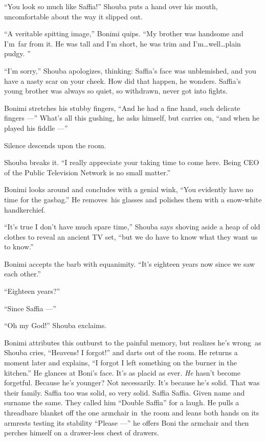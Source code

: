 \documentclass[twoside,11pt]{book}
\begin{document}
``You look so much like Saffia!'' Shouba puts a hand over his mouth, uncomfortable about the
way it slipped out.

``A veritable spitting image,'' Bonimi quips. ``My brother was handsome and
I'm~far from it. He was tall and I'm short, he was trim and I'm{\ldots}well{\ldots}plain pudgy. ''

``I'm sorry,'' Shouba apologizes, thinking: Saffia's face was unblemished,
and{ }you have a nasty scar on your cheek.  How did that happen,
he wonders. Saffia's young brother was always so quiet, so withdrawn, never got into fights.

Bonimi stretches his stubby fingers, ``And he had a fine hand, such delicate fingers ---''
What's all this gushing, he asks himself, but carries on, ``and when he played his fiddle ---''

Silence descends upon the room.

Shouba breaks it. ``I really appreciate your taking time to come here. Being CEO of the Public Television
Network is no small matter.''

Bonimi looks around and concludes with a genial wink, ``You evidently have no time for the
gasbag.'' He removes~his glasses and polishes them with a snow-white handkerchief.

``It's true I don't have much spare time,'' Shouba says shoving aside a heap of old clothes to
reveal an ancient TV set, ``but we do have to know what they want us to know.''

Bonimi accepts the barb with equanimity. ``It's eighteen years now since we saw each other.''

``Eighteen years?''

``Since Saffia ---''

``Oh my God!'' Shouba exclaims.

Bonimi attributes this outburst to the painful memory, but realizes he's wrong~as Shouba cries,
``Heavens!{ }I forgot!''
{ }and darts out of the room. He returns a moment later and explains,
``I forgot I left something on the burner in the kitchen.'' He glances at Boni's face. It's
as placid as ever. \textit{He} hasn't become forgetful. Because he's younger? Not necessarily. It's because he's solid.
That was their family. Saffia too was solid, so very solid. Saffia Saffia. Given name and surname the same. They called
him ``Double Saffia'' for a laugh. He pulls a threadbare blanket off the one armchair in~the
room and leans both hands on its armrests testing its stability ``Please ---'' he offers Boni
the armchair and then perches himself on a drawer-less chest of drawers.
\end{document}
